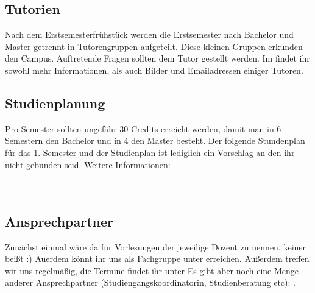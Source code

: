 \begin{multicols}{2}
\subsection*{Tutorien}
Nach dem Erstsemesterfrühstück werden die Erstsemester nach Bachelor und
Master getrennt in Tutorengruppen aufgeteilt. Diese kleinen Gruppen erkunden den Campus. Auftretende Fragen sollten dem Tutor gestellt werden. Im 
 findet ihr sowohl mehr Informationen, als auch Bilder und Emailadressen
einiger Tutoren.%
\subsection*{Studienplanung}
Pro Semester sollten ungefähr 30 Credits erreicht werden, damit man in
6 Semestern den Bachelor und in 4 den Master besteht.
Der folgende Stundenplan für das 1. Semester und der Studienplan ist lediglich ein Vorschlag an den ihr nicht gebunden seid. Weitere Informationen:\\
\\
\\
\subsection*{Ansprechpartner}
Zunächst einmal wäre da für Vorlesungen der jeweilige Dozent zu nennen,
keiner beißt :) Auerdem könnt ihr uns als Fachgruppe unter
  erreichen. Außerdem treffen wir uns regelmäßig,
die Termine findet ihr unter
Es gibt aber noch eine Menge anderer Ansprechpartner
(Studiengangskoordinatorin, Studienberatung etc):
. 


\end{multicols}
